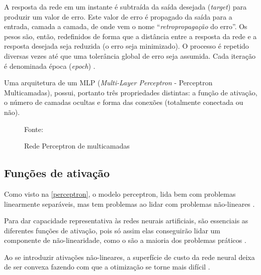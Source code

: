 A resposta da rede em um instante é subtraída da saída desejada (\textit{target}) para produzir um valor de erro. Este valor de erro é propagado da saída para a entrada, camada a camada, de onde vem o nome ``\textit{retropropagação} do erro''. Os pesos são, então, redefinidos de forma que a distância entre a resposta da rede e a resposta desejada seja reduzida (o erro seja minimizado). O processo é repetido diversas vezes até que uma tolerância global de erro seja assumida. Cada iteração é denominada época (\textit{epoch}) \cite{haykin_redes_2001} \cite{hagan_neural_1996} \cite{minsky_perceptrons:_1969}.

Uma arquitetura de um MLP (\textit{Multi-Layer Perceptron} - Perceptron Multicamadas), possui, portanto três propriedades distintas: a função de ativação, o número de camadas ocultas e forma das conexões (totalmente conectada ou não).

\begin{figure}[h!]
	\centering
	\caption{Rede Perceptron de multicamadas}

	{\scriptsize 	Fonte: }
	\label{fig:pmc}
\end{figure}

\subsection{Funções de ativação}\label{funcoes_ativacao}
Como visto na \autoref{perceptron}, o modelo perceptron, lida bem com problemas linearmente separáveis, mas tem problemas ao lidar com problemas  não-lineares \cite{haykin_redes_2001}. 

Para dar capacidade representativa às redes neurais artificiais, são essenciais as diferentes funções de ativação, pois só assim elas conseguirão lidar um componente de não-linearidade, como o são a maioria dos problemas práticos \cite{hagan_neural_1996}.

Ao se introduzir ativações não-lineares, a superfície de custo da rede neural deixa de ser convexa fazendo com que a otimização se torne mais difícil \cite{minsky_perceptrons:_1969} \cite{haykin_redes_2001}.

